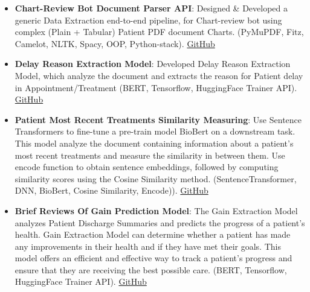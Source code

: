 \documentclass[a4paper,20pt]{article}
\newcommand{\resumeItem}[2]{
  \item\small{
    \textbf{#1}{: #2 \vspace{-2pt}}
  }
}
\newcommand{\resumeSubItem}[2]{\resumeItem{#1}{#2}\vspace{-3pt}}
\begin{document}
          \vspace{7pt}
        \begin{itemize}  
           \resumeSubItem{Chart-Review Bot Document Parser API}
          {Designed \& Developed a generic Data Extraction end-to-end pipeline, for Chart-review bot using complex (Plain + Tabular) Patient PDF document Charts. (PyMuPDF, Fitz, Camelot, NLTK, Spacy, OOP, Python-stack).}\hfill \href{https://github.com/bilalhameed248/PDF-Document-Extraction}{GitHub}
        
          \vspace{7pt}
          
          \resumeSubItem{Delay Reason Extraction Model}
          {Developed Delay Reason Extraction Model, which analyze the document and extracts the reason for Patient delay in Appointment/Treatment (BERT, Tensorflow, HuggingFace Trainer API).}
          \hfill \href{https://github.com/bilalhameed248/Data-Science/blob/main/nlp/finetuned_biobert_for_text_classification_using_tensorflow}{GitHub}
          
          \vspace{7pt}
          
          
          \resumeSubItem{Patient Most Recent Treatments Similarity Measuring}
          {Use Sentence Transformers to fine-tune a pre-train model BioBert on a downstream task. This model analyze the document containing information about a patient's most recent treatments and measure the similarity in between them. Use encode function to obtain sentence embeddings, followed by computing similarity scores using the Cosine Similarity method. (SentenceTransformer, DNN, BioBert, Cosine Similarity, Encode)).}\hfill \href{https://github.com/bilalhameed248/Data-Science/tree/main/nlp/sentence_sililarity_fine_tuning_using_biobert}{GitHub}
          
          \vspace{7pt}
          
          
          \resumeSubItem{Brief Reviews Of Gain Prediction Model}
          {The Gain Extraction Model analyzes Patient Discharge Summaries and predicts the progress of a patient's health.  Gain Extraction Model can determine whether a patient has made any improvements in their health and if they have met their goals. This model offers an efficient and effective way to track a patient's progress and ensure that they are receiving the best possible care. (BERT, Tensorflow, HuggingFace Trainer API).}\hfill \href{https://github.com/bilalhameed248/Data-Science/tree/main/nlp/brief_review_of_gain_prediction_model}{GitHub}
        \end{itemize} 
        
\end{document}
